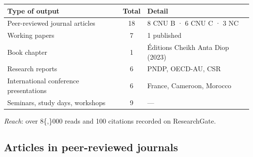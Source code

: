 \documentclass[
  french,
  10pt,
  letterpaper,
  DIV=11,
  numbers=noendperiod]{scrartcl}
\begin{document}
\begin{center}
\small
\begin{tabular}{l c l}
\toprule
\textbf{Type of output} & \textbf{Total} & \textbf{Detail} \\
\midrule
Peer-reviewed journal articles & 18 & 8 CNU B · 6 CNU C · 3 NC \\
Working papers & 7 & 1 published \\
Book chapter & 1 & Éditions Cheikh Anta Diop (2023) \\
Research reports & 6 & PNDP, OECD-AU, CSR \\
International conference presentations & 6 & France, Cameroon, Morocco \\
Seminars, study days, workshops & 9 & — \\
\bottomrule
\end{tabular}
\end{center}

\vspace{-2pt}

\noindent\textit{Reach}: over 8\{,\}000 reads and 100 citations recorded
on ResearchGate.

\subsection{Articles in peer-reviewed
journals}\label{articles-in-peer-reviewed-journals}
\end{document}
